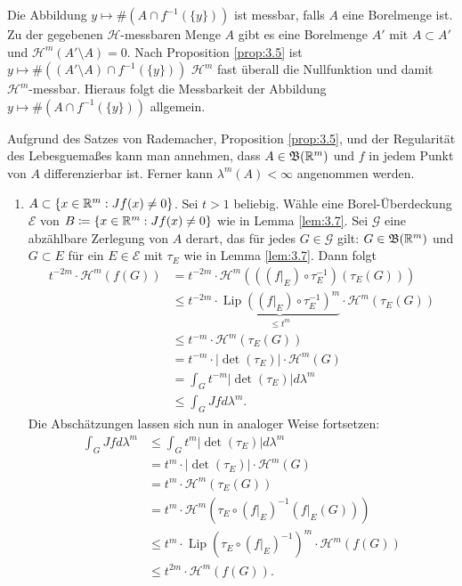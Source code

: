 \documentclass[a4paper,twoside,DIV15,BCOR12mm]{scrbook}
\newcommand{\borel}{\mathfrak B}
\newcommand{\HM}{\mathscr H}
\DeclareMathOperator{\Lip}{Lip}
\begin{document}
\begin{beweis}
Die Abbildung $y\mapsto \#(A\cap f^{-1}(\{y\}))$ ist messbar, falls $A$ eine Borelmenge ist. Zu der
gegebenen $\HM$-messbaren Menge $A$ gibt es eine Borelmenge $A'$ mit $A\subset A'$ und $\HM^m(A'\setminus A)=0$. 
Nach Proposition \ref{prop:3.5} ist $y\mapsto \#((A'\setminus A)\cap f^{-1}(\{y\}))$ 
$\HM^m$ fast überall die Nullfunktion und damit $\HM^m$-messbar. Hieraus folgt die Messbarkeit 
der Abbildung $y\mapsto \#(A\cap f^{-1}(\{y\}))$ allgemein. 


Aufgrund des Satzes von Rademacher, Proposition \ref{prop:3.5}, und der Regularität des Lebesguemaßes kann man annehmen, dass $A\in\borel(\MdR^m)$ und $f$ in jedem Punkt von $A$ differenzierbar ist. Ferner kann $\lambda^m(A) < \infty$ angenommen werden.
\begin{enumerate}[{Fall} (a):]
\item $A\subset \{x\in\mathbb{R}^m: Jf(x)\ne 0\}$. Sei $t>1$ beliebig. Wähle eine Borel-Überdeckung $\mathcal E$ von $B\da \{x\in\MdR^m: Jf(x) \ne 0\}$ wie in Lemma \ref{lem:3.7}. Sei $\mathcal G$ eine abzählbare Zerlegung von $A$ derart, das für jedes $G\in\mathcal G$ gilt: $G\in \borel(\MdR^m)$ und $G\subset E$ für ein $E\in\mathcal E$ mit  $\tau_E$ wie in Lemma \ref{lem:3.7}. Dann folgt
\begin{align*}
t^{-2m}\cdot\HM^m(f(G)) 
&= t^{-2m} \cdot \HM^m( ( (f|_E)\circ\tau_E^{-1}) (\tau_E(G)) ) \\
&\le t^{-2m} \cdot \underbrace{\Lip( (f|_E)\circ\tau_E^{-1})^m}_{\le t^m} \cdot \HM^m(\tau_E(G))\\
&\le t^{-m} \cdot \HM^m(\tau_E(G))\\
&= t^{-m} \cdot |\det(\tau_E)| \cdot \HM^m(G) \\
&=\int_G t^{-m} |\det(\tau_E)| d\lambda^m \\
&\le \int_G Jfd\lambda^m.
\end{align*}
Die Abschätzungen lassen sich nun in analoger Weise fortsetzen:
\begin{align*}
\int_G Jfd\lambda^m
&\le \int_G t^m |\det(\tau_E)| d\lambda^m \\
&= t^m \cdot |\det(\tau_E)| \cdot \HM^m(G) \\
&= t^m \cdot \HM^m(\tau_E(G)) \\
&= t^m \cdot \HM^m(\tau_E \circ (f|_E)^{-1} (f|_E(G))) \\
&\le t^m \cdot \Lip(\tau_E \circ (f|_E)^{-1})^m \cdot \HM^m(f(G)) \\
&\le t^{2m} \cdot \HM^m(f(G)).
\end{align*}

\end{enumerate}
\end{beweis}
\end{document}
